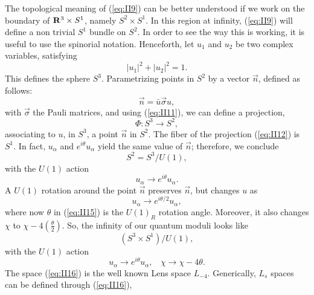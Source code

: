 The topological meaning of (\ref{eq:II9}) can be better
understood if we work \cite{SW3d} on the boundary of ${\bf R}^3 \times S^1$,
namely $S^2 \times S^1$. In this region at infinity,
(\ref{eq:II9}) will define a non trivial $S^1$ bundle on $S^2$.
In order to see the way this is working, it is useful to use
the spinorial notation. Henceforth, let $u_1$ and $u_2$ be two
complex variables, satisfying
\begin{equation}
|u_1|^2+|u_2|^2=1.
\label{eq:II10}
\end{equation}
This defines the sphere $S^3$. Parametrizing points in
$S^2$ by a vector $\vec{n}$, defined as follows:
\begin{equation}
\vec{n} = \bar{u} \vec{\sigma} u,
\label{eq:II11}
\end{equation}
with $\vec{\sigma}$ the Pauli matrices, and using (\ref{eq:II11}), we
can define a projection,
\begin{equation}
\Phi: S^3 \rightarrow S^2,
\label{eq:II12}
\end{equation}
associating to $u$, in $S^3$, a point $\vec{n}$ in $S^2$. The
fiber of the projection (\ref{eq:II12}) is $S^1$. In fact,
$u_{\alpha}$ and $e^{i \theta}u_{\alpha}$ yield the same value
of $\vec{n}$; therefore, we conclude
\begin{equation}
S^2 = S^3 /U(1),
\label{eq:II13}
\end{equation}
with the $U(1)$ action
\begin{equation}
u_{\alpha} \rightarrow e^{i \theta} u_{\alpha}.
\label{eq:II14}
\end{equation}
A $U(1)$ rotation around the point $\vec{n}$ preserves
$\vec{n}$, but changes $u$ as
\begin{equation}
u_{\alpha} \rightarrow e^{i \theta /2} u_{\alpha},
\label{eq:II15}
\end{equation}
where now $\theta$ in (\ref{eq:II15}) is the $U(1)_R$ rotation
angle. Moreover, it also changes $\chi$ to $\chi - 4 \left(
\frac {\theta}{2} \right)$. So, the infinity of our quantum
moduli looks like
\begin{equation}
(S^3 \times S^1)/U(1),
\label{eq:II16}
\end{equation}
with the $U(1)$ action
\begin{equation}
u_{\alpha} \rightarrow e^{i \theta} u_{\alpha}, \: \: \: \: \chi
\rightarrow \chi - 4 \theta.
\label{eq:II17}
\end{equation}
The space (\ref{eq:II16}) is the well known Lens space $L_{-4}$.
Generically, $L_s$ spaces can be defined through (\ref{eq:II16}),
